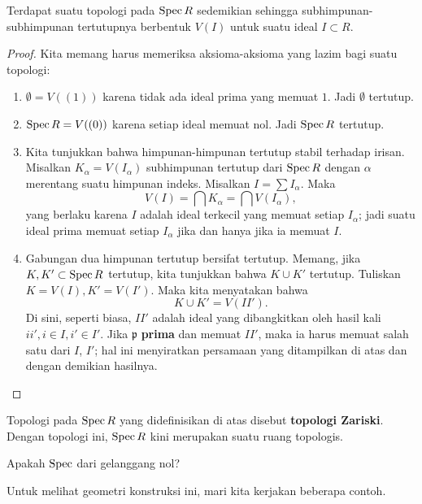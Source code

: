 \begin{proposition} 
Terdapat suatu topologi pada $\operatorname{Spec} R$ sedemikian sehingga subhimpunan-subhimpunan tertutupnya
berbentuk
$V(I)$ untuk suatu ideal $I \subset R$.
\end{proposition} 

\begin{proof} 
Kita memang harus memeriksa aksioma-aksioma yang lazim bagi suatu topologi:
\begin{enumerate}
\item $\emptyset = V((1))$ karena tidak ada ideal prima yang memuat $1$. Jadi
$\emptyset$ tertutup.
\item $\operatorname{Spec} R = V((0))$ karena setiap ideal memuat nol. Jadi
$\operatorname{Spec} R$
tertutup.
\item Kita tunjukkan bahwa himpunan-himpunan tertutup stabil terhadap irisan.
Misalkan
$K_{\alpha} = V(I_{\alpha})$ subhimpunan tertutup dari $\operatorname{Spec} R$ dengan
$\alpha$
merentang suatu himpunan indeks. Misalkan $I
= \sum I_{\alpha}$. Maka 
\[ V(I) = \bigcap K_{\alpha} = \bigcap V(I_{\alpha}),  \]
yang berlaku karena $I$ adalah ideal terkecil yang memuat setiap
$I_{\alpha}$;
jadi suatu ideal prima memuat setiap $I_{\alpha}$ jika dan hanya jika ia memuat $I$.  
\item Gabungan dua himpunan tertutup bersifat tertutup. Memang, jika $K,K'
\subset \operatorname{Spec}
R$ tertutup, kita tunjukkan bahwa $K \cup K'$ tertutup. Tuliskan $K= V(I), K' =
V(I')$. Maka
kita menyatakan bahwa 
\[ K \cup K'  = V(II').  \]
Di sini, seperti biasa, $II'$ adalah ideal yang dibangkitkan oleh hasil kali $ii', i \in I, i'
\in I'$. Jika
$\mathfrak{p}$ \textbf{prima} dan memuat $II'$, maka ia harus
memuat salah satu dari $I$, $I'$;
hal ini menyiratkan persamaan yang ditampilkan di atas dan dengan demikian
hasilnya.
\end{enumerate}
\end{proof} 
\begin{definition} 
Topologi pada $\operatorname{Spec} R$ yang didefinisikan di atas disebut
\textbf{topologi
Zariski}. Dengan topologi ini, $\operatorname{Spec} R$ kini merupakan suatu ruang topologis.
\end{definition} 

\begin{exercise} 
Apakah $\operatorname{Spec}$ dari gelanggang nol?
\end{exercise} 

Untuk melihat geometri konstruksi ini, mari kita kerjakan
beberapa contoh.

